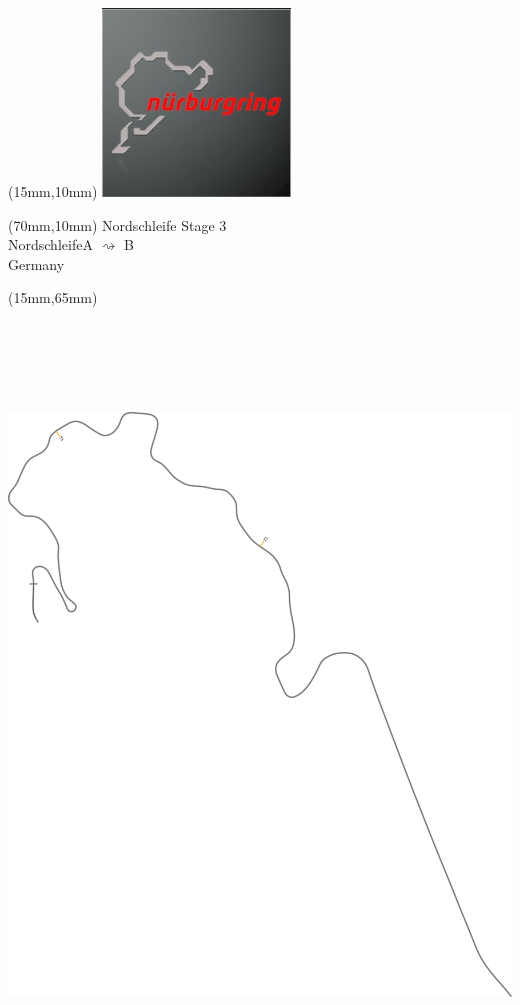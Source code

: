 \null\newpage
\begin{textblock*}{50mm}(15mm,10mm)%
\includegraphics[width=50mm]{LG/2015-05-20_00088.png}
\end{textblock*}
\begin{textblock*}{130mm}(70mm,10mm)%
{\fontsize{20}{20}\selectfont Nordschleife Stage 3\\}
{\fontsize{16}{16}\selectfont Nordschleife\hfill A $\rightsquigarrow$ B\\}
{\fontsize{12}{12}\selectfont Germany\\}
\end{textblock*}
\begin{textblock*}{185mm}(15mm,65mm)%
\centering
\mbox{\includegraphics[width=185mm,height=210mm,keepaspectratio]{PT/NOS3.pdf}}
\end{textblock*}
